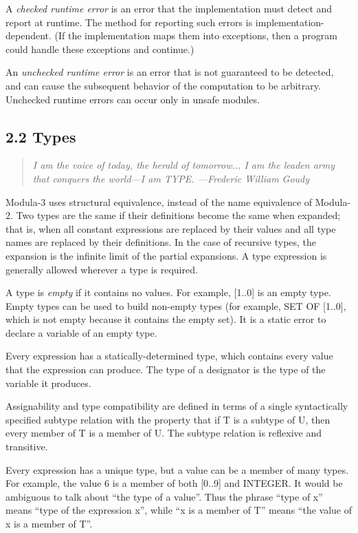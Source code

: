 \documentclass[10pt]{article}
\begin{document}
 A \emph{checked runtime error}
 is an error that the implementation must detect and report at runtime. The method for reporting such errors is implementation-dependent. (If the implementation maps them into exceptions, then a program could handle these exceptions and continue.) 


 An \emph{unchecked runtime error}
 is an error that is not guaranteed to be detected, and can cause the subsequent behavior of the computation to be arbitrary. Unchecked runtime errors can occur only in unsafe modules. 


 
\subsection*{2.2 Types}


 
\begin{quote}
\emph{ I am the voice of today, the herald of tomorrow... I am the leaden army that conquers the world---I am TYPE. ---Frederic William Goudy }
\end{quote}



 Modula-3 uses structural equivalence, instead of the name equivalence of Modula-2. Two types are the same if their definitions become the same when expanded; that is, when all constant expressions are replaced by their values and all type names are replaced by their definitions. In the case of recursive types, the expansion is the infinite limit of the partial expansions. A type expression is generally allowed wherever a type is required. 


 A type is \emph{empty}
 if it contains no values. For example, [1..0] is an empty type. Empty types can be used to build non-empty types (for example, SET OF [1..0], which is not empty because it contains the empty set). It is a static error to declare a variable of an empty type. 


  Every expression has a statically-determined type, which contains every value that the expression can produce. The type of a designator is the type of the variable it produces. 


  Assignability and type compatibility are defined in terms of a single syntactically specified subtype relation with the property that if T is a subtype of U, then every member of T is a member of U. The subtype relation is reflexive and transitive. 


  Every expression has a unique type, but a value can be a member of many types. For example, the value 6 is a member of both [0..9] and INTEGER. It would be ambiguous to talk about ``the type of a value''. Thus the phrase ``type of x'' means ``type of the expression x'', while ``x is a member of T'' means ``the value of x is a member of T''. 
\end{document}
